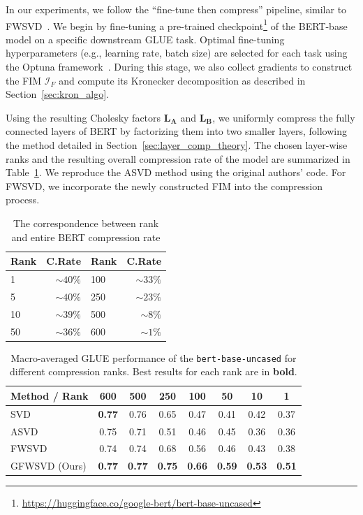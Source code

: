 \documentclass{article}
\begin{document}
In our experiments, we follow the “fine-tune then compress” pipeline, similar to FWSVD~\cite{FWSVD}. We begin by fine-tuning a pre-trained checkpoint\footnote{\url{https://huggingface.co/google-bert/bert-base-uncased}} of the BERT-base model on a specific downstream GLUE task. Optimal fine-tuning hyperparameters (e.g., learning rate, batch size) are selected for each task using the Optuna framework~\cite{akiba2019optuna}. During this stage, we also collect gradients to construct the FIM $\mathcal{I}_F$ and compute its Kronecker decomposition as described in Section~\ref{sec:kron_algo}.

Using the resulting Cholesky factors $\mathbf{L}_\mathbf{A}$ and $\mathbf{L}_\mathbf{B}$, we uniformly compress the fully connected layers of BERT by factorizing them into two smaller layers, following the method detailed in Section~\ref{sec:layer_comp_theory}. The chosen layer-wise ranks and the resulting overall compression rate of the model are summarized in Table~\ref{tab:bert_ranks}. We reproduce the ASVD method using the original authors’ code. For FWSVD, we incorporate the newly constructed FIM into the compression process.


\begin{table}[htbp!]
\label{rank_rate}
\centering
\caption{The correspondence between rank and entire BERT compression rate}
\label{tab:bert_ranks}
\begin{tabular}{ l | r  | l | r}
\toprule
Rank & C.Rate & Rank & C.Rate \\
\midrule
1 & $\sim 40\%$ & 100 & $\sim 33\%$\\
5 & $\sim 40\%$ & 250 & $\sim 23\%$ \\
10& $\sim 39\%$ & 500 & $\sim 8\%$\\
50& $\sim 36\%$ & 600 & $\sim 1\%$\\
\bottomrule
\end{tabular}
\end{table}



\begin{table}[htbp!]
  \vspace{-12pt}
  \centering
  \footnotesize
  \caption{Macro-averaged GLUE performance of the \texttt{bert-base-uncased} for different compression ranks. Best results for each rank are in \textbf{bold}.}
  \label{tab:glue_results}
  \setlength{\tabcolsep}{2pt}
  \begin{tabular}{lccccccc}
    \toprule
    Method / Rank & 600 & 500 & 250 & 100 & 50 & 10 & 1 \\
    \midrule
    SVD             & \textbf{0.77} & 0.76 & 0.65 & 0.47 & 0.41 & 0.42 & 0.37 \\
    ASVD~\cite{asvd}   & 0.75 & 0.71 & 0.51 & 0.46 & 0.45 & 0.36 & 0.36 \\
    FWSVD~\cite{FWSVD} & 0.74 & 0.74 & 0.68 & 0.56 & 0.46 & 0.43 & 0.38 \\
    GFWSVD (Ours)   & \textbf{0.77} & \textbf{0.77} & \textbf{0.75} & \textbf{0.66} & \textbf{0.59} & \textbf{0.53} & \textbf{0.51} \\
    \bottomrule
  \end{tabular}
  \vspace{-12pt}
\end{table}
\end{document}
